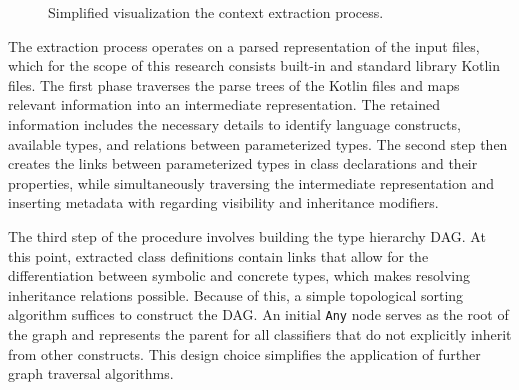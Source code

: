 \begin{figure}[!hbtp]
\begin{minipage}[t]{-4\linewidth}
\end{minipage}
\vspace{3.5cm}
\caption{Simplified visualization the context extraction process.}
\label{fig:context-extraction}
\end{figure}

The extraction process operates on a parsed representation of the input
files, which for the scope of this research consists built-in and standard library 
Kotlin files.
The first phase traverses the parse trees of the Kotlin files and maps
relevant information into an intermediate representation.
The retained information includes the necessary details to identify language constructs,
available types, and relations between parameterized types.
The second step then creates the links between 
parameterized types in class declarations and their properties, while simultaneously
traversing the intermediate representation and inserting metadata with regarding
visibility and inheritance modifiers.

The third step of the procedure involves building the type hierarchy \Gls{DAG}.
At this point, extracted class definitions contain links that allow for the
differentiation between symbolic and concrete types, which makes resolving
inheritance relations possible.
Because of this, a simple topological sorting algorithm suffices to construct the \Gls{DAG}.
An initial \texttt{Any} node serves as the root of the graph
and represents the parent for all classifiers
that do not explicitly inherit from other constructs.
This design choice simplifies the application of further graph traversal algorithms.


